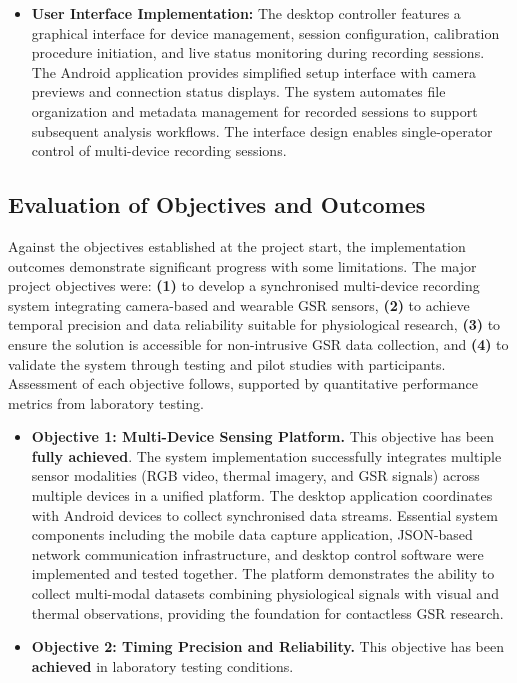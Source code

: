 \documentclass[12pt,a4paper]{article}
\begin{document}
\begin{itemize}
\tightlist
\item
  \textbf{User Interface Implementation:} The desktop controller features a graphical interface for device management, session configuration, calibration procedure initiation, and live status monitoring during recording sessions. The Android application provides simplified setup interface with camera previews and connection status displays. The system automates file organization and metadata management for recorded sessions to support subsequent analysis workflows. The interface design enables single-operator control of multi-device recording sessions.
\end{itemize}

\subsection{Evaluation of Objectives and Outcomes}\label{evaluation-of-objectives-and-outcomes}

Against the objectives established at the project start, the implementation outcomes demonstrate significant progress with some limitations. The major project objectives were: \textbf{(1)} to develop a synchronised multi-device recording system integrating camera-based and wearable GSR sensors, \textbf{(2)} to achieve temporal precision and data reliability suitable for physiological research, \textbf{(3)} to ensure the solution is accessible for non-intrusive GSR data collection, and \textbf{(4)} to validate the system through testing and pilot studies with participants. Assessment of each objective follows, supported by quantitative performance metrics from laboratory testing.

\begin{itemize}
\item
  \textbf{Objective 1: Multi-Device Sensing Platform.} This objective has been \textbf{fully achieved}. The system implementation successfully integrates multiple sensor modalities (RGB video, thermal imagery, and GSR signals) across multiple devices in a unified platform. The desktop application coordinates with Android devices to collect synchronised data streams. Essential system components including the mobile data capture application, JSON-based network communication infrastructure, and desktop control software were implemented and tested together. The platform demonstrates the ability to collect multi-modal datasets combining physiological signals with visual and thermal observations, providing the foundation for contactless GSR research.
\item
  \textbf{Objective 2: Timing Precision and Reliability.} This objective has been \textbf{achieved} in laboratory testing conditions.
\end{itemize}
\end{document}
